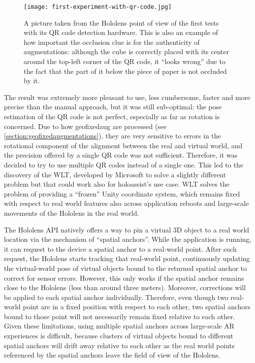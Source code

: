 \begin{figure}
  \centering
  \texttt{[image: first-experiment-with-qr-code.jpg]}
  \caption{A picture taken from the Hololens point of view of the first tests with its QR code detection hardware. This is also an example of how important the occlusion clue is for the authenticity of augmentations: although the cube is correctly placed with its center around the top-left corner of the QR code, it \enquote{looks wrong} due to the fact that the part of it below the piece of paper is not occluded by it.}\label{fig:first_experiments_with_hololens}
\end{figure}

The result was extremely more pleasant to use, less cumbersome, faster and more precise than the manual approach, but it was still sub-optimal: the pose estimation of the QR code is not perfect, especially as far as rotation is concerned. Due to how \gls{geofixedaug} are processed (see \autoref{section:geofixedaugmentations}), they are very sensitive to errors in the rotational component of the alignment between the real and virtual world, and the precision offered by a single QR code was not sufficient. Therefore, it was decided to try to use multiple QR codes instead of a single one. This led to the discovery of the \gls{WLT}\cite{microsoft_corporation_world_nodate}, developed by Microsoft to solve a slightly different problem but that could work also for \gls{holoassist}'s use case. \gls{WLT} solves the problem of providing a \enquote{frozen} Unity coordinate system, which remains fixed with respect to real world features also across application reboots and large-scale movements of the Hololens in the real world.

The Hololens \gls{API} natively offers a way to pin a virtual 3D object to a real world location via the mechanism of \enquote{spatial anchors}. While the application is running, it can request to the device a spatial anchor to a real-world point. After such request, the Hololens starts tracking that real-world point, continuously updating the virtual-world pose of virtual objects bound to the returned spatial anchor to correct for sensor errors. However, this only works if the spatial anchor remains close to the Hololens (less than around three meters). Moreover, corrections will be applied to each spatial anchor individually. Therefore, even though two real-world point are in a fixed position with respect to each other, two spatial anchors bound to those point will not necessarily remain fixed relative to each other. Given these limitations, using multiple spatial anchors across large-scale \gls{AR} experiences is difficult, because clusters of virtual objects bound to different spatial anchors will drift away relative to each other as the real world points referenced by the spatial anchors leave the field of view of the Hololens.

